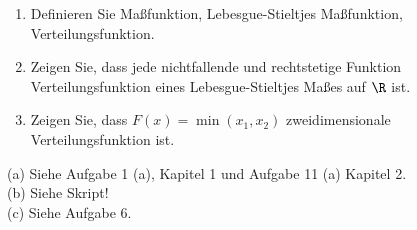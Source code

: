 
\begin{exercise}

\phantom{}

\begin{enumerate}[label = (\alph*)]

  \item
  Definieren Sie Maßfunktion, Lebesgue-Stieltjes Maßfunktion, Verteilungsfunktion.
  
  \item
  Zeigen Sie, dass jede nichtfallende und rechtstetige Funktion Verteilungsfunktion eines Lebesgue-Stieltjes Maßes auf $\R$ ist.
  
  \item
  Zeigen Sie, dass $F(x) = \min(x_1, x_2)$ zweidimensionale Verteilungsfunktion ist.

\end{enumerate}

\end{exercise}


\begin{solution}

(a) Siehe Aufgabe 1 (a), Kapitel 1 und Aufgabe 11 (a) Kapitel 2. \\

(b) Siehe Skript! \\

(c) Siehe Aufgabe 6.

\end{solution}


